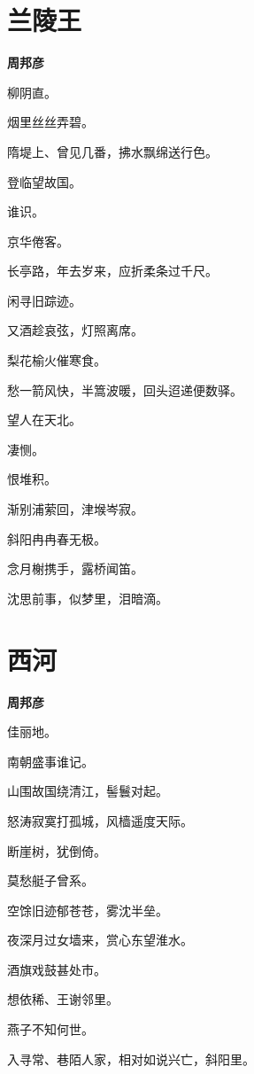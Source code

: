 \documentclass[12pt,a4paper]{ctexbook}
\begin{document}
\section{兰陵王}
\textbf{周邦彦}\par\vspace{0.5em}
柳阴直。\par
烟里丝丝弄碧。\par
隋堤上、曾见几番，拂水飘绵送行色。\par
登临望故国。\par
谁识。\par
京华倦客。\par
长亭路，年去岁来，应折柔条过千尺。\par
闲寻旧踪迹。\par
又酒趁哀弦，灯照离席。\par
梨花榆火催寒食。\par
愁一箭风快，半篙波暖，回头迢递便数驿。\par
望人在天北。\par
凄恻。\par
恨堆积。\par
渐别浦萦回，津堠岑寂。\par
斜阳冉冉春无极。\par
念月榭携手，露桥闻笛。\par
沈思前事，似梦里，泪暗滴。\par

\section{西河}
\textbf{周邦彦}\par\vspace{0.5em}
佳丽地。\par
南朝盛事谁记。\par
山围故国绕清江，髻鬟对起。\par
怒涛寂寞打孤城，风樯遥度天际。\par
断崖树，犹倒倚。\par
莫愁艇子曾系。\par
空馀旧迹郁苍苍，雾沈半垒。\par
夜深月过女墙来，赏心东望淮水。\par
酒旗戏鼓甚处市。\par
想依稀、王谢邻里。\par
燕子不知何世。\par
入寻常、巷陌人家，相对如说兴亡，斜阳里。\par
\end{document}
